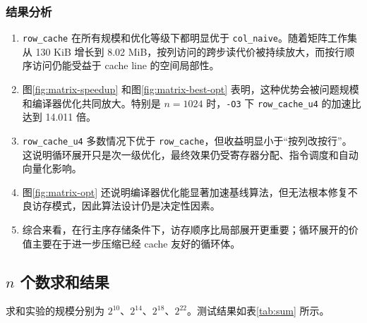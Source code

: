 \documentclass[a4paper]{article}
\begin{document}
\subsubsection{结果分析}
\begin{enumerate}
  \item \texttt{row\_cache} 在所有规模和优化等级下都明显优于 \texttt{col\_naive}。随着矩阵工作集从 130 KiB 增长到 8.02 MiB，按列访问的跨步读代价被持续放大，而按行顺序访问仍能受益于 cache line 的空间局部性。
  \item 图\ref{fig:matrix-speedup} 和图\ref{fig:matrix-best-opt} 表明，这种优势会被问题规模和编译器优化共同放大。特别是 $n=1024$ 时，\texttt{-O3} 下 \texttt{row\_cache\_u4} 的加速比达到 14.011 倍。
  \item \texttt{row\_cache\_u4} 多数情况下优于 \texttt{row\_cache}，但收益明显小于“按列改按行”。这说明循环展开只是次一级优化，最终效果仍受寄存器分配、指令调度和自动向量化影响。
  \item 图\ref{fig:matrix-opt} 还说明编译器优化能显著加速基线算法，但无法根本修复不良访存模式，因此算法设计仍是决定性因素。
  \item 综合来看，在行主序存储条件下，访存顺序比局部展开更重要；循环展开的价值主要在于进一步压缩已经 cache 友好的循环体。
\end{enumerate}

\subsection{\texorpdfstring{$n$}{n} 个数求和结果}
求和实验的规模分别为 $2^{10}$、$2^{14}$、$2^{18}$、$2^{22}$。测试结果如表\ref{tab:sum} 所示。
\end{document}
